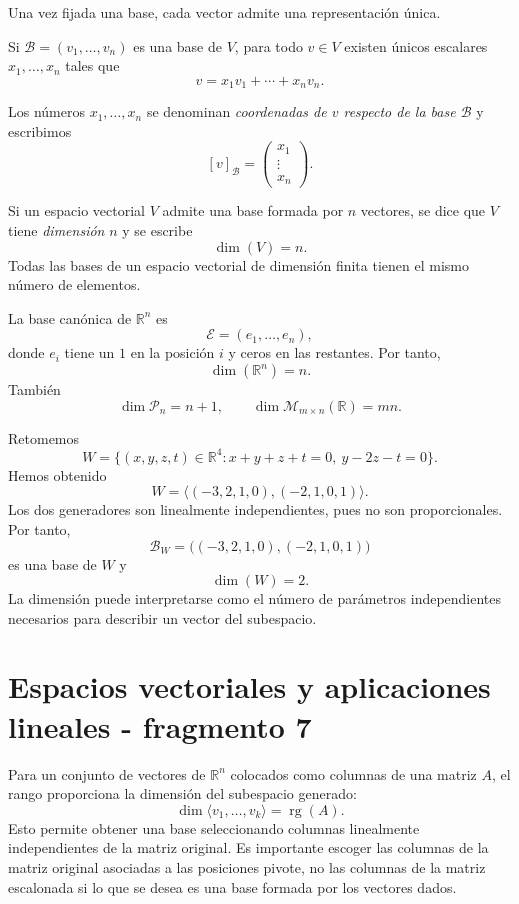 Una vez fijada una base, cada vector admite una representación única.

\begin{theorem}
Si $\mathcal B=(v_1,\ldots,v_n)$ es una base de $V$, para todo $v\in V$ existen únicos escalares $x_1,\ldots,x_n$ tales que
\[
v=x_1v_1+\cdots+x_nv_n.
\]
\end{theorem}

Los números $x_1,\ldots,x_n$ se denominan \emph{coordenadas de $v$ respecto de la base $\mathcal B$} y escribimos
\[
[v]_{\mathcal B}
=
\begin{pmatrix}
x_1\\ \vdots\\ x_n
\end{pmatrix}.
\]

\begin{definition}[Dimensión]
Si un espacio vectorial $V$ admite una base formada por $n$ vectores, se dice que $V$ tiene \emph{dimensión} $n$ y se escribe
\[
\dim(V)=n.
\]
Todas las bases de un espacio vectorial de dimensión finita tienen el mismo número de elementos.
\end{definition}

La base canónica de $\mathbb{R}^n$ es
\[
\mathcal E=(e_1,\ldots,e_n),
\]
donde $e_i$ tiene un $1$ en la posición $i$ y ceros en las restantes. Por tanto,
\[
\dim(\mathbb{R}^n)=n.
\]
También
\[
\dim\mathcal P_n=n+1,
\qquad
\dim\mathcal M_{m\times n}(\mathbb{R})=mn.
\]

\begin{example}
Retomemos
\[
W=\{(x,y,z,t)\in\mathbb{R}^4:x+y+z+t=0,\ y-2z-t=0\}.
\]
Hemos obtenido
\[
W=\langle(-3,2,1,0),(-2,1,0,1)\rangle.
\]
Los dos generadores son linealmente independientes, pues no son proporcionales. Por tanto,
\[
\mathcal B_W=\bigl((-3,2,1,0),(-2,1,0,1)\bigr)
\]
es una base de $W$ y
\[
\boxed{\dim(W)=2.}
\]
La dimensión puede interpretarse como el número de parámetros independientes necesarios para describir un vector del subespacio.
\end{example}


\section{Espacios vectoriales y aplicaciones lineales - fragmento 7}
Para un conjunto de vectores de $\mathbb{R}^n$ colocados como columnas de una matriz $A$, el rango proporciona la dimensión del subespacio generado:
\[
\boxed{
\dim\langle v_1,\ldots,v_k\rangle
=
\operatorname{rg}(A).
}
\]
Esto permite obtener una base seleccionando columnas linealmente independientes de la matriz original. Es importante escoger las columnas de la matriz original asociadas a las posiciones pivote, no las columnas de la matriz escalonada si lo que se desea es una base formada por los vectores dados.

